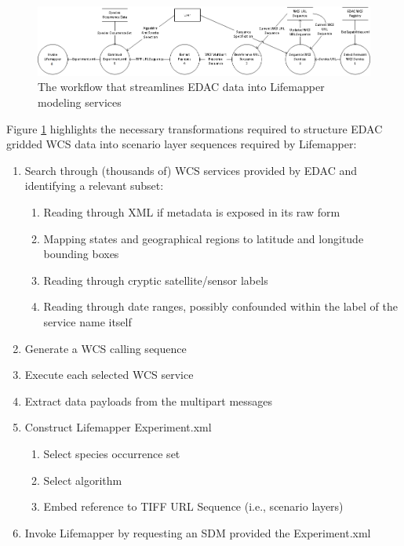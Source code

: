 \documentclass[letterpaper]{article}
\begin{document}
\begin{figure}
\center
\includegraphics[width=170mm]{images/elseweb-workflow.png}
\caption{The workflow that streamlines EDAC data into Lifemapper modeling services}
\label{fig:elseweb-workflow}
\end{figure}

Figure \ref{fig:elseweb-workflow} highlights the necessary transformations required to structure EDAC gridded WCS data into scenario layer sequences required by Lifemapper:

\begin{small}
\begin{enumerate}
\item Search through (thousands of) WCS services provided by EDAC and identifying a relevant subset:
    \begin{enumerate}
	\item Reading through XML if metadata is exposed in its raw form
	\item Mapping states and geographical regions to latitude and longitude bounding boxes
	\item Reading through cryptic satellite/sensor labels
	\item Reading through date ranges, possibly confounded within the label of the service name itself
	\end{enumerate}
\item Generate a WCS calling sequence
\item Execute each selected WCS service
\item Extract data payloads from the multipart messages
\item Construct Lifemapper Experiment.xml
    \begin{enumerate}
    \item Select species occurrence set
    \item Select algorithm
    \item Embed reference to TIFF URL Sequence (i.e., scenario layers) 
	\end{enumerate}
\item Invoke Lifemapper by requesting an SDM provided the Experiment.xml
\end{enumerate}
\end{small} 
 
\end{document}
